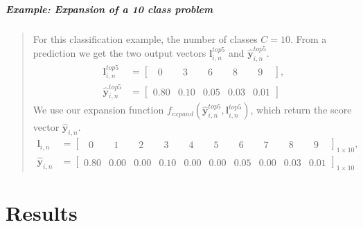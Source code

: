 \subparagraph{Example: Expansion of a 10 class problem} 
\blockquote[]{	 	
	For this classification example, the number of classes $C=10$. From a prediction we get the two output vectors $\mathbf{l}_{i,n}^{top5}$ and $ \mathbf{\hat{y}}_{i,n}^{top5}$.
	\begin{align*}
	\mathbf{l}_{i,n}^{top5} &= \begin{bmatrix}
	\phantom{0}0\phantom{.0} & \phantom{0}3\phantom{.0} & \phantom{0}6\phantom{.0} & \phantom{0}8\phantom{.0} & \phantom{0}9\phantom{.0}
	\end{bmatrix},\\
	\mathbf{\hat{y}}_{i,n}^{top5} &= \begin{bmatrix}
	0.80 & 0.10 & 0.05 & 0.03 & 0.01
	\end{bmatrix}
	\end{align*}
	We use our expansion function $ f_{expand}\left(\bm{\hat{y}}_{i,n}^{top5},\mathbf{l}_{i,n}^{top5}\right) $, which return the score vector $ \mathbf{\hat{y}}_{i,n}$.
	\begin{align*}
	\mathbf{l}_{i,n} &= \begin{bmatrix}
	\phantom{0}0\phantom{.0} & \phantom{0}1\phantom{.0} & \phantom{0}2\phantom{.0} & \phantom{0}3\phantom{.0} & \phantom{0}4\phantom{.0} & \phantom{0}5\phantom{.0} & \phantom{0}6\phantom{.0} & \phantom{0}7\phantom{.0} & \phantom{0}8\phantom{.0} & \phantom{0}9\phantom{.0}
	\end{bmatrix}_{1 \times 10},\\
	\mathbf{\hat{y}}_{i,n}  &= \begin{bmatrix}
	0.80 & 0.00 & 0.00 & 0.10 & 0.00 & 0.00 & 0.05 & 0.00 & 0.03 & 0.01
	\end{bmatrix}_{1 \times 10}
	\end{align*}
}      

\section{Results} \label{sec:edge-results}

